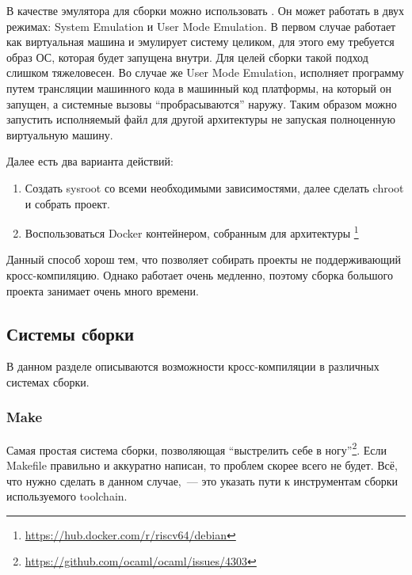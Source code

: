 В качестве эмулятора для сборки можно использовать \qemu{}.
Он может работать в двух режимах: System Emulation и User Mode Emulation.
В первом случае \qemu{} работает как виртуальная машина и эмулирует систему целиком, для этого ему требуется образ ОС, которая будет запущена внутри.
Для целей сборки такой подход слишком тяжеловесен.
Во случае же User Mode Emulation, \qemu{} исполняет программу путем трансляции машинного кода в машинный код платформы, на который он запущен, а системные вызовы \enquote{пробрасываются} наружу.
Таким образом можно запустить исполняемый файл для другой архитектуры не запуская полноценную виртуальную машину.

Далее есть два варианта действий:
\begin{enumerate}
	\item Создать sysroot со всеми необходимыми зависимостями, далее сделать chroot и собрать проект.
	\item Воспользоваться Docker контейнером, собранным для архитектуры \riscv{}\footnote{\url{https://hub.docker.com/r/riscv64/debian}}
\end{enumerate}

Данный способ хорош тем, что позволяет собирать проекты не поддерживающий кросс-компиляцию.
Однако \qemu{} работает очень медленно, поэтому сборка большого проекта занимает очень много времени.

\subsection{Системы сборки}
\label{subsec:build_systems}

В данном разделе описываются возможности кросс-компиляции в различных системах сборки.

\subsubsection{Make}

Самая простая система сборки, позволяющая \enquote{выстрелить себе в ногу}\footnote{\url{https://github.com/ocaml/ocaml/issues/4303}}.
Если Makefile правильно и аккуратно написан, то проблем скорее всего не будет.
Всё, что нужно сделать в данном случае,~--- это указать пути к инструментам сборки используемого toolchain.


